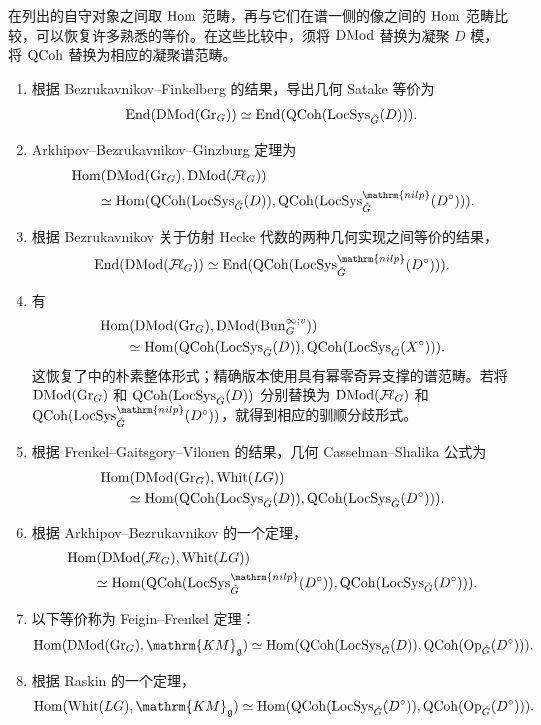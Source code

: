 在列出的自守对象之间取 $\operatorname{Hom}$ 范畴，再与它们在谱一侧的像之间的 $\operatorname{Hom}$ 范畴比较，可以恢复许多熟悉的等价。在这些比较中，须将 $\operatorname{DMod}$ 替换为凝聚 $D$ 模，将 $\operatorname{QCoh}$ 替换为相应的凝聚谱范畴。
\begin{enumerate}
\item 根据 Bezrukavnikov–Finkelberg 的结果，导出几何 Satake 等价为
\[\operatorname{End}(\operatorname{DMod}(\operatorname{Gr}_G))\simeq\operatorname{End}(\operatorname{QCoh}(\operatorname{LocSys}_{\check{G}}(D))).\]
\item Arkhipov–Bezrukavnikov–Ginzburg 定理为
\[
\begin{aligned}
&\Hom(\DMod(\Gr_G),\DMod(\Fl_G))\\
&\qquad\simeq\Hom(\QCoh(\LocSys_{\checkG}(D)),\QCoh(\LocSys_{\checkG}^{\mathrm{nilp}}(D^\circ))).
\end{aligned}
\]
\item 根据 Bezrukavnikov 关于仿射 Hecke 代数的两种几何实现之间等价的结果，
\[\End(\DMod(\Fl_G))\simeq\End(\QCoh(\LocSys_{\checkG}^{\mathrm{nilp}}(D^\circ))).\]
\item 有
\[
\begin{aligned}
&\operatorname{Hom}(\operatorname{DMod}(\operatorname{Gr}_G),\operatorname{DMod}(\operatorname{Bun}_G^{\infty;v}))\\
&\qquad\simeq\operatorname{Hom}(\operatorname{QCoh}(\operatorname{LocSys}_{\check{G}}(D)),\operatorname{QCoh}(\operatorname{LocSys}_{\check{G}}(X^\circ))).
\end{aligned}
\]
这恢复了中的朴素整体形式；精确版本使用具有幂零奇异支撑的谱范畴。若将 $\operatorname{DMod}(\operatorname{Gr}_G)$ 和 $\operatorname{QCoh}(\operatorname{LocSys}_{\check{G}}(D))$ 分别替换为 $\operatorname{DMod}(\mathcal{F}\!\ell_G)$ 和 $\QCoh(\LocSys_{\checkG}^{\mathrm{nilp}}(D^\circ))$，就得到相应的驯顺分歧形式。
\item 根据 Frenkel–Gaitsgory–Vilonen 的结果\cite{FGKV98}，几何 Casselman–Shalika 公式为
\[
\begin{aligned}
&\operatorname{Hom}(\operatorname{DMod}(\operatorname{Gr}_G),\operatorname{Whit}(LG))\\
&\qquad\simeq\operatorname{Hom}(\operatorname{QCoh}(\operatorname{LocSys}_{\check{G}}(D)),\operatorname{QCoh}(\operatorname{LocSys}_{\check{G}}(D^\circ))).
\end{aligned}
\]
\item 根据 Arkhipov–Bezrukavnikov 的一个定理，
\[
\begin{aligned}
&\Hom(\DMod(\Fl_G),\Whit(LG))\\
&\qquad\simeq\Hom(\QCoh(\LocSys_{\checkG}^{\mathrm{nilp}}(D^\circ)),\QCoh(\LocSys_{\checkG}(D^\circ))).
\end{aligned}
\]
\item 以下等价称为 Feigin–Frenkel 定理\cite{Fre02}：
\[\Hom(\DMod(\Gr_G),\mathrm{KM}_{\mathfrak g})\simeq\Hom(\QCoh(\LocSys_{\checkG}(D)),\QCoh(\Op_{\checkG}(D^\circ))).\]
\item 根据 Raskin 的一个定理，
\[\Hom(\Whit(LG),\mathrm{KM}_{\mathfrak g})\simeq\Hom(\QCoh(\LocSys_{\checkG}(D^\circ)),\QCoh(\Op_{\checkG}(D^\circ))).\]
\end{enumerate}

